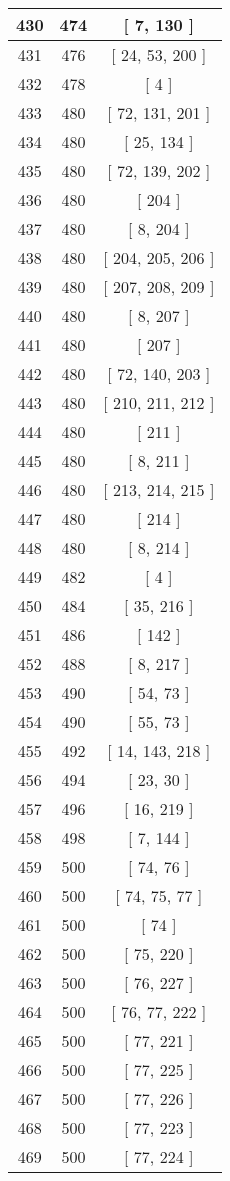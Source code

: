 \begin{center}
\begin{longtable}[H]{|| c c c ||}
\hline
430 & 474 & [ 7, 130 ] \\ 
\hline
431 & 476 & [ 24, 53, 200 ] \\ 
\hline
432 & 478 & [ 4 ] \\ 
\hline
433 & 480 & [ 72, 131, 201 ] \\ 
\hline
434 & 480 & [ 25, 134 ] \\ 
\hline
435 & 480 & [ 72, 139, 202 ] \\ 
\hline
436 & 480 & [ 204 ] \\ 
\hline
437 & 480 & [ 8, 204 ] \\ 
\hline
438 & 480 & [ 204, 205, 206 ] \\ 
\hline
439 & 480 & [ 207, 208, 209 ] \\ 
\hline
440 & 480 & [ 8, 207 ] \\ 
\hline
441 & 480 & [ 207 ] \\ 
\hline
442 & 480 & [ 72, 140, 203 ] \\ 
\hline
443 & 480 & [ 210, 211, 212 ] \\ 
\hline
444 & 480 & [ 211 ] \\ 
\hline
445 & 480 & [ 8, 211 ] \\ 
\hline
446 & 480 & [ 213, 214, 215 ] \\ 
\hline
447 & 480 & [ 214 ] \\ 
\hline
448 & 480 & [ 8, 214 ] \\ 
\hline
449 & 482 & [ 4 ] \\ 
\hline
450 & 484 & [ 35, 216 ] \\ 
\hline
451 & 486 & [ 142 ] \\ 
\hline
452 & 488 & [ 8, 217 ] \\ 
\hline
453 & 490 & [ 54, 73 ] \\ 
\hline
454 & 490 & [ 55, 73 ] \\ 
\hline
455 & 492 & [ 14, 143, 218 ] \\ 
\hline
456 & 494 & [ 23, 30 ] \\ 
\hline
457 & 496 & [ 16, 219 ] \\ 
\hline
458 & 498 & [ 7, 144 ] \\ 
\hline
459 & 500 & [ 74, 76 ] \\ 
\hline
460 & 500 & [ 74, 75, 77 ] \\ 
\hline
461 & 500 & [ 74 ] \\ 
\hline
462 & 500 & [ 75, 220 ] \\ 
\hline
463 & 500 & [ 76, 227 ] \\ 
\hline
464 & 500 & [ 76, 77, 222 ] \\ 
\hline
465 & 500 & [ 77, 221 ] \\ 
\hline
466 & 500 & [ 77, 225 ] \\ 
\hline
467 & 500 & [ 77, 226 ] \\ 
\hline
468 & 500 & [ 77, 223 ] \\ 
\hline
469 & 500 & [ 77, 224 ] \\ 
\hline
\end{longtable}
\end{center}
